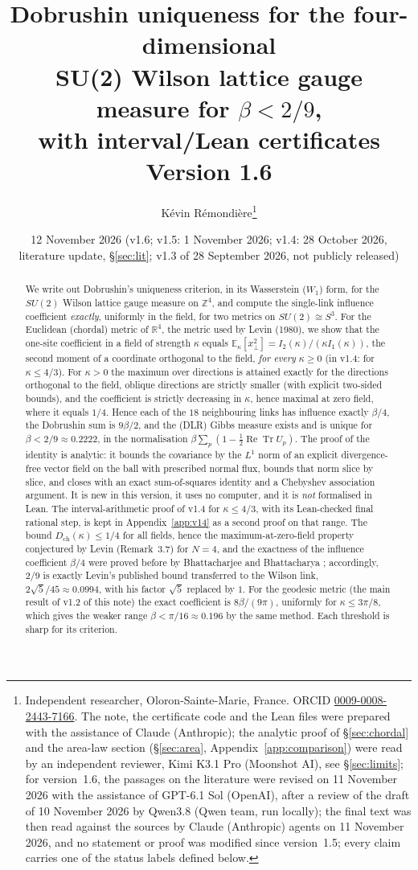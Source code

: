 \documentclass[11pt,a4paper]{article}
\title{Dobrushin uniqueness for the four-dimensional\\ SU(2) Wilson lattice gauge measure for $\beta<2/9$,\\
with interval/Lean certificates\\[4pt]
\large Version 1.6}
\author{K\'evin R\'emondi\`ere\thanks{Independent researcher, Oloron-Sainte-Marie, France. ORCID
\href{https://orcid.org/0009-0008-2443-7166}{0009-0008-2443-7166}. The note, the certificate code and the Lean
files were prepared with the assistance of Claude (Anthropic); the analytic proof of \S\ref{sec:chordal} and the area-law
section (\S\ref{sec:area}, Appendix~\ref{app:comparison}) were read by an independent reviewer, Kimi K3.1 Pro (Moonshot AI),
see \S\ref{sec:limits}; for version~1.6, the passages on the literature were revised on 11 November 2026 with the assistance of GPT-6.1 Sol (OpenAI), after a review of the draft of 10 November 2026 by Qwen3.8 (Qwen team, run locally); the final text was then read against the sources by Claude (Anthropic) agents on 11 November 2026, and no statement or proof was modified since version~1.5; every claim carries one of the status labels defined below.}}
\date{12 November 2026 (v1.6; v1.5: 1 November 2026; v1.4: 28 October 2026, literature update, \S\ref{sec:lit}; v1.3 of 28 September 2026, not publicly released)}
\theoremstyle{remark}
\theoremstyle{definition}
\theoremstyle{plain}
\theoremstyle{remark}
\newcommand{\R}{\mathbb{R}}
\newcommand{\Z}{\mathbb{Z}}
\newcommand{\E}{\mathbb{E}}
\newcommand{\ReTr}{\operatorname{Re}\operatorname{Tr}}
\newcommand{\Dch}{D_{\mathrm{ch}}}
\begin{document}
\maketitle

\begin{abstract}
We write out Dobrushin's uniqueness criterion, in its Wasserstein ($W_1$) form, for the $SU(2)$ Wilson lattice
gauge measure on $\Z^4$, and compute the single-link influence coefficient \emph{exactly}, uniformly in the
field, for two metrics on $SU(2)\cong S^3$.
For the Euclidean (chordal) metric of $\R^4$, the metric used by Levin (1980), we show that the one-site
coefficient in a field of strength $\kappa$ equals $\E_\kappa[x_\perp^2]=I_2(\kappa)/(\kappa I_1(\kappa))$, the
second moment of a coordinate orthogonal to the field, \emph{for every} $\kappa\ge0$ (in v1.4: for $\kappa\le4/3$).
For $\kappa>0$ the maximum over directions is attained exactly for the directions orthogonal to the field, oblique
directions are strictly smaller (with explicit two-sided bounds), and the coefficient is strictly decreasing in
$\kappa$, hence maximal at zero field, where it equals $1/4$. Hence each of the $18$ neighbouring links has
influence exactly $\beta/4$, the Dobrushin sum is $9\beta/2$, and the (DLR) Gibbs measure exists and is unique
for $\beta<2/9\approx0.2222$, in the normalisation $\beta\sum_p(1-\tfrac12\ReTr U_p)$.
The proof of the identity is analytic: it bounds the covariance by the $L^1$ norm of an explicit divergence-free
vector field on the ball with prescribed normal flux, bounds that norm slice by slice, and closes with an exact
sum-of-squares identity and a Chebyshev association argument. It is new in this version, it uses no computer, and it is
\emph{not} formalised in Lean. The interval-arithmetic proof of v1.4 for $\kappa\le4/3$, with its Lean-checked final
rational step, is kept in Appendix~\ref{app:v14} as a second proof on that range.
The bound $\Dch(\kappa)\le1/4$ for all fields, hence the maximum-at-zero-field property conjectured by Levin
(Remark~3.7) for $N=4$, and the exactness of the influence coefficient $\beta/4$ were proved before by
Bhattacharjee and Bhattacharya \cite{BB26}; accordingly, $2/9$ is exactly Levin's published bound transferred to
the Wilson link, $2\sqrt5/45\approx0.0994$, with his factor $\sqrt5$ replaced by $1$.
For the geodesic metric (the main result of v1.2 of this note) the exact coefficient is $8\beta/(9\pi)$,
uniformly for $\kappa\le3\pi/8$, which gives the weaker range $\beta<\pi/16\approx0.196$ by the same method.
Each threshold is sharp for its criterion.

\end{abstract}
\end{document}
